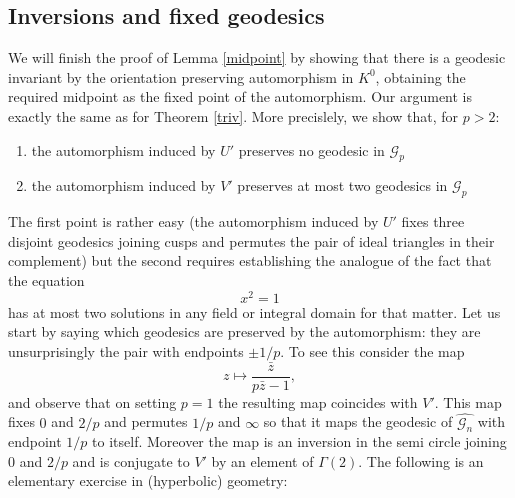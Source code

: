\documentclass[12pt,a4paper]{amsart}
\def\g2{\Gamma(2)}
\def\gg{\mathcal{G}_n}
\def\ggp{\mathcal{G}_p}
\begin{document}
\subsection{Inversions and fixed geodesics}

We will finish the proof of  Lemma \ref{midpoint}
by showing that there is a geodesic invariant by 
the orientation preserving automorphism in $K^0$,
obtaining the required midpoint as the fixed point of the automorphism.
Our  argument is exactly  the same as for
 Theorem \ref{triv}.
 More precislely, we show that, for $p > 2$:
\begin{enumerate}
\item the automorphism induced by $U'$ preserves no geodesic in  $\ggp$
\item the automorphism induced by $V'$ preserves at most two geodesics in $\ggp$
\end{enumerate}

The first point is rather easy 
(the automorphism induced by $U'$ fixes three disjoint geodesics joining 
cusps and permutes the pair of ideal triangles in their complement)
 but the second requires establishing
 the analogue of the fact that  the equation
$$x^2 = 1$$
has at most two solutions in any field or integral domain for that matter. 
Let us start by saying which geodesics are preserved 
by the automorphism: they are unsurprisingly the pair with endpoints $\pm 1/p$.
To see this consider the map
\begin{equation}
\label{inversion}
z \mapsto \frac{\bar{z}}{ p\bar{z} - 1},
\end{equation}
and observe that on setting $p=1$ the resulting map coincides with $V'$.
This map fixes $0$ and $2/p$ and permutes $1/p$ and $\infty$
 so that it maps the geodesic of $\hat{\gg}$ with endpoint $1/p$ to itself.
 Moreover the map  is an inversion in the semi circle joining $0$ and $2/p$  
and is conjugate to $V'$ by an element of $\g2$. 
The following is an elementary exercise in (hyperbolic) geometry:
\end{document}
